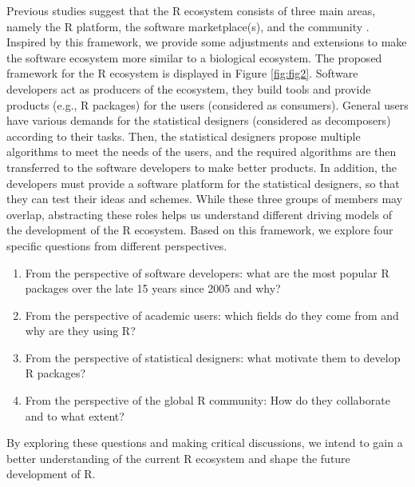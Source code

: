 Previous studies suggest that the R ecosystem consists of three main
areas, namely the R platform, the software marketplace(s), and the
community \citep{PlakidasSchall-561}. Inspired by this framework, we
provide some adjustments and extensions to make the software ecosystem
more similar to a biological ecosystem. The proposed framework for the R
ecosystem is displayed in Figure \ref{fig:fig2}. Software developers act
as producers of the ecosystem, they build tools and provide products
(e.g., R packages) for the users (considered as consumers). General
users have various demands for the statistical designers (considered as
decomposers) according to their tasks. Then, the statistical designers
propose multiple algorithms to meet the needs of the users, and the
required algorithms are then transferred to the software developers to
make better products. In addition, the developers must provide a
software platform for the statistical designers, so that they can test
their ideas and schemes. While these three groups of members may
overlap, abstracting these roles helps us understand different driving
models of the development of the R ecosystem. Based on this framework,
we explore four specific questions from different perspectives.

\begin{enumerate}
\def\labelenumi{\arabic{enumi}.}
\tightlist
\item
  From the perspective of software developers: what are the most popular
  R packages over the late 15 years since 2005 and why?
\item
  From the perspective of academic users: which fields do they come from
  and why are they using R?
\item
  From the perspective of statistical designers: what motivate them to
  develop R packages?
\item
  From the perspective of the global R community: How do they
  collaborate and to what extent?
\end{enumerate}

By exploring these questions and making critical discussions, we intend
to gain a better understanding of the current R ecosystem and shape the
future development of R.

